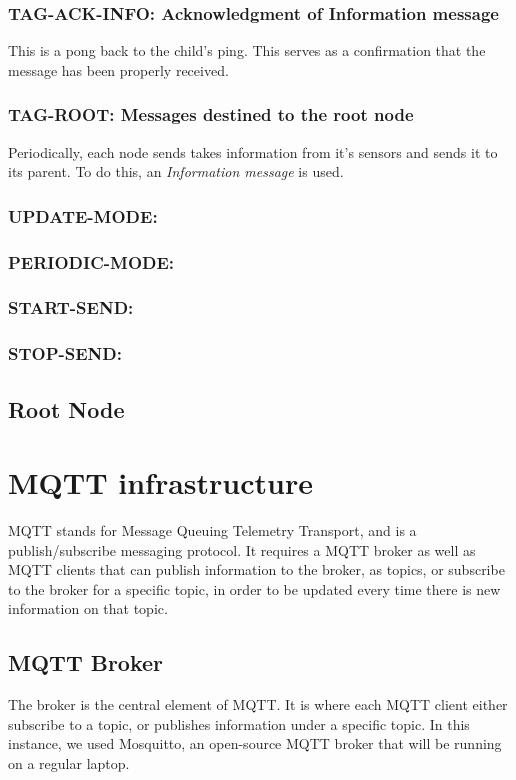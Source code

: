 \documentclass[a4paper,11pt]{article}
\begin{document}
\subsubsection{TAG-ACK-INFO: Acknowledgment of Information message}
This is a pong back to the child's ping. This serves as a confirmation that the message has been properly received.


\subsubsection{TAG-ROOT: Messages destined to the root node}
Periodically, each node sends takes information from it's sensors and sends it to its parent. To do this, an \textit{Information message} is used.


\subsubsection{UPDATE-MODE: }
\subsubsection{PERIODIC-MODE: }
\subsubsection{START-SEND:}
\subsubsection{STOP-SEND:}


\subsection{Root Node}


\section{MQTT infrastructure}
MQTT stands for Message Queuing Telemetry Transport, and is a publish/subscribe messaging protocol. It requires a MQTT broker as well as MQTT clients that can publish information to the broker, as topics, or subscribe to the broker for a specific topic, in order to be updated every time there is new information on that topic.

\subsection{MQTT Broker}
The broker is the central element of MQTT. It is where each MQTT client either subscribe to a topic, or publishes information under a specific topic. In this instance, we used Mosquitto, an open-source MQTT broker that will be running on a regular laptop.
\end{document}
